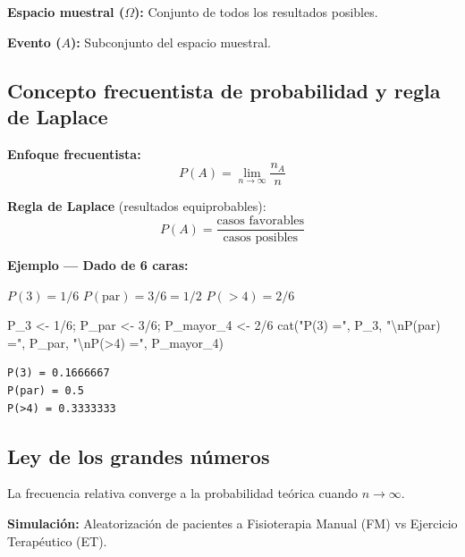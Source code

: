 \documentclass[
  letterpaper,
  DIV=11,
  numbers=noendperiod]{scrartcl}
\newenvironment{Shaded}{\begin{snugshade}}{\end{snugshade}}
\newcommand{\DecValTok}[1]{\textcolor[rgb]{0.68,0.00,0.00}{#1}}
\newcommand{\FunctionTok}[1]{\textcolor[rgb]{0.28,0.35,0.67}{#1}}
\newcommand{\NormalTok}[1]{\textcolor[rgb]{0.00,0.23,0.31}{#1}}
\newcommand{\OtherTok}[1]{\textcolor[rgb]{0.00,0.23,0.31}{#1}}
\newcommand{\SpecialCharTok}[1]{\textcolor[rgb]{0.37,0.37,0.37}{#1}}
\newcommand{\StringTok}[1]{\textcolor[rgb]{0.13,0.47,0.30}{#1}}
\begin{document}
\textbf{Espacio muestral (\(\Omega\)):} Conjunto de todos los resultados
posibles.

\textbf{Evento (\(A\)):} Subconjunto del espacio muestral.

\subsection{Concepto frecuentista de probabilidad y regla de
Laplace}\label{concepto-frecuentista-de-probabilidad-y-regla-de-laplace}

\textbf{Enfoque frecuentista:}
\[P(A) = \lim_{n \to \infty} \frac{n_A}{n}\]

\textbf{Regla de Laplace} (resultados equiprobables):
\[P(A) = \frac{\text{casos favorables}}{\text{casos posibles}}\]

\textbf{Ejemplo --- Dado de 6 caras:}

\(P(3) = 1/6\) \(P(\text{par}) = 3/6 = 1/2\) \(P(>4) = 2/6\)

\begin{Shaded}
\begin{Highlighting}[]
\NormalTok{P\_3 }\OtherTok{\textless{}{-}} \DecValTok{1}\SpecialCharTok{/}\DecValTok{6}\NormalTok{; P\_par }\OtherTok{\textless{}{-}} \DecValTok{3}\SpecialCharTok{/}\DecValTok{6}\NormalTok{; P\_mayor\_4 }\OtherTok{\textless{}{-}} \DecValTok{2}\SpecialCharTok{/}\DecValTok{6}
\FunctionTok{cat}\NormalTok{(}\StringTok{"P(3) ="}\NormalTok{, P\_3, }\StringTok{"}\SpecialCharTok{\textbackslash{}n}\StringTok{P(par) ="}\NormalTok{, P\_par, }\StringTok{"}\SpecialCharTok{\textbackslash{}n}\StringTok{P(\textgreater{}4) ="}\NormalTok{, P\_mayor\_4)}
\end{Highlighting}
\end{Shaded}

\begin{verbatim}
P(3) = 0.1666667 
P(par) = 0.5 
P(>4) = 0.3333333
\end{verbatim}

\subsection{Ley de los grandes
números}\label{ley-de-los-grandes-numeros}

La frecuencia relativa converge a la probabilidad teórica cuando
\(n \to \infty\).

\textbf{Simulación:} Aleatorización de pacientes a Fisioterapia Manual
(FM) vs Ejercicio Terapéutico (ET).
\end{document}
